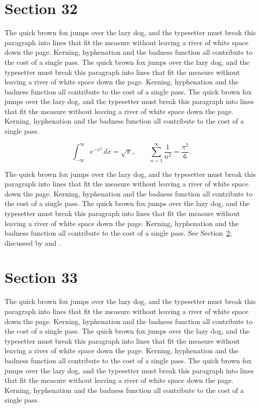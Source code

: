 \documentclass{article}
\begin{document}
\section{Section 32}
\label{sec:32}
The quick brown fox jumps over the lazy dog, and the typesetter must break this paragraph into lines that fit the measure without leaving a river of white space down the page. Kerning, hyphenation and the badness function all contribute to the cost of a single pass. The quick brown fox jumps over the lazy dog, and the typesetter must break this paragraph into lines that fit the measure without leaving a river of white space down the page. Kerning, hyphenation and the badness function all contribute to the cost of a single pass. The quick brown fox jumps over the lazy dog, and the typesetter must break this paragraph into lines that fit the measure without leaving a river of white space down the page. Kerning, hyphenation and the badness function all contribute to the cost of a single pass. 

\begin{equation}\label{eq:32}
\int_{-\infty}^{\infty} e^{-x^{2}}\,dx = \sqrt{\pi}, \qquad
\sum_{n=1}^{\infty} \frac{1}{n^{2}} = \frac{\pi^{2}}{6}.
\end{equation}

The quick brown fox jumps over the lazy dog, and the typesetter must break this paragraph into lines that fit the measure without leaving a river of white space down the page. Kerning, hyphenation and the badness function all contribute to the cost of a single pass. The quick brown fox jumps over the lazy dog, and the typesetter must break this paragraph into lines that fit the measure without leaving a river of white space down the page. Kerning, hyphenation and the badness function all contribute to the cost of a single pass. 
See Section~\ref{sec:33}; discussed by \textcite{k3} and \textcite{l5}.
\section{Section 33}
\label{sec:33}
The quick brown fox jumps over the lazy dog, and the typesetter must break this paragraph into lines that fit the measure without leaving a river of white space down the page. Kerning, hyphenation and the badness function all contribute to the cost of a single pass. The quick brown fox jumps over the lazy dog, and the typesetter must break this paragraph into lines that fit the measure without leaving a river of white space down the page. Kerning, hyphenation and the badness function all contribute to the cost of a single pass. The quick brown fox jumps over the lazy dog, and the typesetter must break this paragraph into lines that fit the measure without leaving a river of white space down the page. Kerning, hyphenation and the badness function all contribute to the cost of a single pass. 
\end{document}
